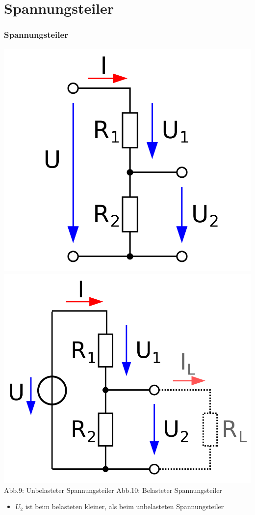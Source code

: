 \section{Spannungsteiler}
\begin{frame}
	\frametitle{Spannungsteiler}
	 \includegraphics[scale=0.13]{a02/spannungsteiler-unbelastet.png}
	 \hspace{2mm}
	 \includegraphics[scale=0.13]{a02/spannungsteiler-belastet.png}\\
	 	\tiny{Abb.9: Unbelasteter Spannungsteiler \cite{wp}}
	 	\hspace{10mm}
 		\tiny{Abb.10: Belasteter Spannungsteiler \cite{wp}} 
 	\begin{itemize}
 		\item $U_2$ ist beim belasteten kleiner, als beim unbelasteten Spannungsteiler
	\end{itemize} 		
\end{frame}

